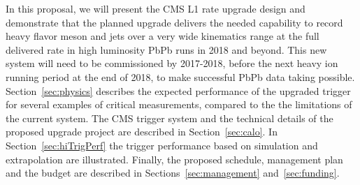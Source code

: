 In this proposal, we will present the CMS L1 rate upgrade design and demonstrate that the planned upgrade delivers the needed capability to record heavy flavor meson and jets over a very wide kinematics range at the full delivered rate in high luminosity PbPb runs in 2018 and beyond. This new system will need to be commissioned by 2017-2018, before the next heavy ion running period at the end of 2018, to make successful PbPb data taking possible. Section~\ref{sec:physics} describes the expected performance of the upgraded trigger for several examples of critical measurements, compared to the the limitations of the current system. The CMS trigger system and the technical details of the proposed upgrade project are described in Section~\ref{sec:calo}. In Section~\ref{sec:hiTrigPerf} the trigger performance based on simulation and extrapolation are illustrated. Finally, the proposed schedule, management plan and the budget are described in Sections~\ref{sec:management} and~\ref{sec:funding}.

